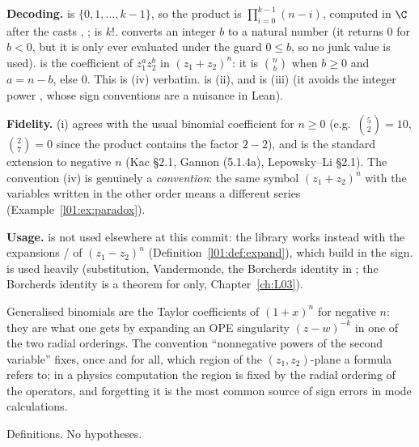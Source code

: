 \begin{dictionary}
\textbf{Decoding.}  is $\{0,1,\dots,k-1\}$, so the product is
$\prod_{i=0}^{k-1}(n-i)$, computed in $\C$ after the casts , ; 
is $k!$.  converts an integer $b$ to a natural number (it returns $0$ for $b<0$, but it is only
ever evaluated under the guard $0\le b$, so no junk value is used).  is the
coefficient of $z_1^az_2^b$ in $(z_1+z_2)^n$: it is $\binom nb$ when $b\ge0$ and $a = n-b$, else $0$. This
is (iv) verbatim.  is (ii), and  is (iii) (it avoids the integer power
, whose sign conventions are a nuisance in Lean).

\textbf{Fidelity.} (i) agrees with the usual binomial coefficient for $n\ge0$ (e.g.\ $\binom 52 = 10$,
$\binom 27 = 0$ since the product contains the factor $2-2$), and is the standard extension to negative
$n$ (Kac §2.1, Gannon (5.1.4a), Lepowsky--Li §2.1). The convention (iv) is genuinely a
\emph{convention}: the same symbol $(z_1+z_2)^n$ with the variables written in the other order means a
different series (Example~\ref{l01:ex:paradox}).

\textbf{Usage.}  is not used elsewhere at this commit: the library works instead
with the expansions / of $(z_1-z_2)^n$ (Definition~\ref{l01:def:expand}),
which build in the sign.  is used heavily (substitution, Vandermonde, the Borcherds identity in
; the Borcherds identity is a theorem for
 only, Chapter~\ref{ch:L03}).
\end{dictionary}

\begin{physics}
Generalised binomials are the Taylor coefficients of $(1+x)^n$ for negative $n$: they are what one gets
by expanding an OPE singularity $(z-w)^{-k}$ in one of the two radial orderings. The convention
``nonnegative powers of the second variable'' fixes, once and for all, which region of the
$(z_1,z_2)$-plane a formula refers to; in a physics computation the region is fixed by the radial
ordering of the operators, and forgetting it is the most common source of sign errors in mode
calculations.
\end{physics}

\begin{status}
Definitions. No hypotheses.
\end{status}

